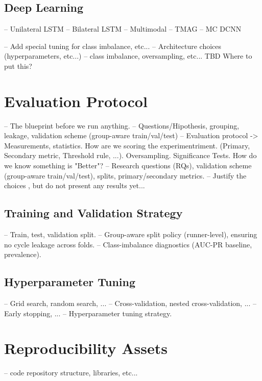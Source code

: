 \subsection{Deep Learning}\label{subsec:advanced-models}
-- Unilateral LSTM
-- Bilateral LSTM
-- Multimodal
-- TMAG
-- MC DCNN

-- Add special tuning for class imbalance, etc...
-- Architecture choices (hyperparameters, etc...)
-- class imbalance, oversampling, etc... TBD Where to put this?




\section{Evaluation Protocol}\label{sec:evaluation-protocol}
-- The blueprint before we run anything.
-- Questions/Hipothesis, grouping, leakage, validation scheme (group-aware train/val/test)
-- Evaluation protocol -> Measurements, statistics. How are we scoring the experimentriment. (Primary, Secondary metric, Threshold rule, ...). Oversampling. Significance Tests. How do we know something is "Better"?
-- Research questions (RQs), validation scheme (group-aware train/val/test), splits, primary/secondary metrics.
-- Justify the choices , but do not present any results yet...

\subsection{Training and Validation Strategy}\label{subsec:method-training-validation-strategy}
-- Train, test, validation split.
-- Group-aware split policy (runner-level), ensuring no cycle leakage across folds.
-- Class-imbalance diagnostics (AUC-PR baseline, prevalence).

\subsection{Hyperparameter Tuning}\label{subsec:method-hyperparameter-tuning}
-- Grid search, random search, ...
-- Cross-validation, nested cross-validation, ...
-- Early stopping, ...
-- Hyperparameter tuning strategy.

\section{Reproducibility Assets}\label{sec:method-reproducibility}
-- code repository structure, libraries, etc...